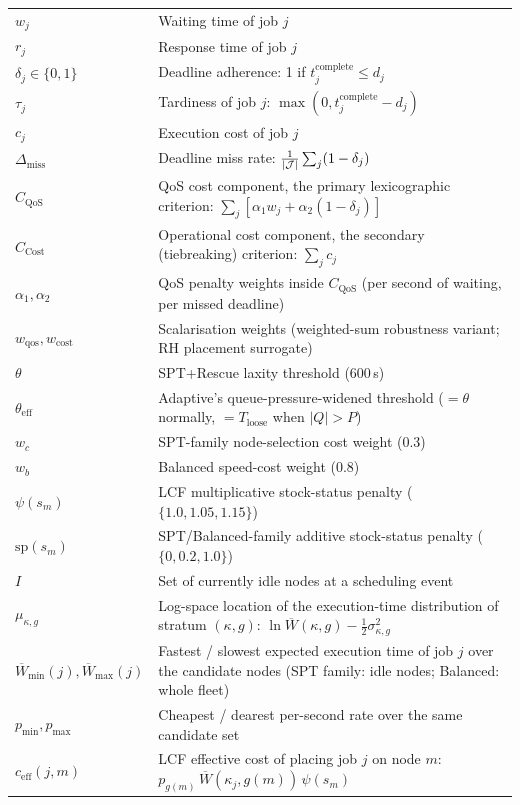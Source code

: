 \begin{longtable}{l>{\raggedright\arraybackslash}p{10cm}}
$w_j$ & Waiting time of job $j$ \\
$r_j$ & Response time of job $j$ \\
$\delta_j \in \{0,1\}$ & Deadline adherence: 1 if $t_j^{\text{complete}} \leq d_j$ \\
$\tau_j$ & Tardiness of job $j$: $\max(0, t_j^{\text{complete}} - d_j)$ \\
$c_j$ & Execution cost of job $j$ \\
$\Delta_{\text{miss}}$ & Deadline miss rate: $\frac{1}{|\mathcal{J}|}\sum_j (1-\delta_j)$ \\
$C_{\text{QoS}}$ & QoS cost component, the primary lexicographic criterion: $\sum_j [\alpha_1 w_j + \alpha_2 (1-\delta_j)]$ \\
$C_{\text{Cost}}$ & Operational cost component, the secondary (tiebreaking) criterion: $\sum_j c_j$ \\
$\alpha_1, \alpha_2$ & QoS penalty weights inside $C_{\text{QoS}}$ (per second of waiting, per missed deadline) \\
$w_{\text{qos}}, w_{\text{cost}}$ & Scalarisation weights (weighted-sum robustness variant; RH placement surrogate) \\
$\theta$ & SPT+Rescue laxity threshold (600\,s) \\
$\theta_{\text{eff}}$ & Adaptive's queue-pressure-widened threshold ($=\theta$ normally, $=T_{\text{loose}}$ when $|Q| > P$) \\
$w_c$ & SPT-family node-selection cost weight (0.3) \\
$w_b$ & Balanced speed-cost weight (0.8) \\
$\psi(s_m)$ & LCF multiplicative stock-status penalty ($\{1.0, 1.05, 1.15\}$) \\
$\text{sp}(s_m)$ & SPT/Balanced-family additive stock-status penalty ($\{0, 0.2, 1.0\}$) \\
$I$ & Set of currently idle nodes at a scheduling event \\
$\mu_{\kappa,g}$ & Log-space location of the execution-time distribution of stratum $(\kappa,g)$: $\ln \overline{W}(\kappa,g) - \tfrac{1}{2}\sigma_{\kappa,g}^2$ \\
$\overline{W}_{\min}(j), \overline{W}_{\max}(j)$ & Fastest / slowest expected execution time of job $j$ over the candidate nodes (SPT family: idle nodes; Balanced: whole fleet) \\
$p_{\min}, p_{\max}$ & Cheapest / dearest per-second rate over the same candidate set \\
$c_{\text{eff}}(j,m)$ & LCF effective cost of placing job $j$ on node $m$: $p_{g(m)}\,\overline{W}(\kappa_j, g(m))\,\psi(s_m)$ \\

\end{longtable}
